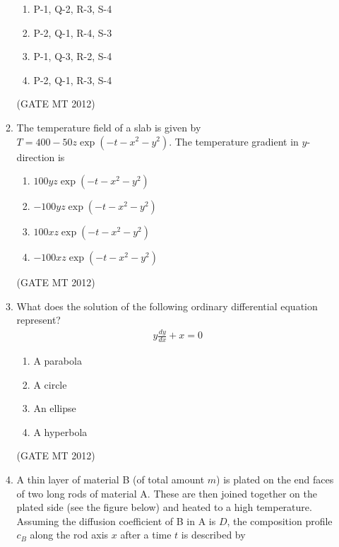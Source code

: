 \documentclass[journal, 11pt, onecolumn]{IEEEtran}
\theoremstyle{remark}
\begin{document}
\begin{enumerate}
\begin{enumerate}
\begin{multicols}{2}
\begin{enumerate}  
\item P-1, Q-2, R-3, S-4
\item P-2, Q-1, R-4, S-3
\item P-1, Q-3, R-2, S-4
\item P-2, Q-1, R-3, S-4
\end{enumerate}
\end{multicols}
\hfill(GATE MT 2012)

\item The temperature field of a slab is given by $T = 400 - 50z \exp(-t - x^2 - y^2)$. The temperature gradient in $y$-direction is

\begin{multicols}{2}
\begin{enumerate}  
\item $100yz \exp(-t - x^2 - y^2)$
\item $-100yz \exp(-t - x^2 - y^2)$
\item $100xz \exp(-t - x^2 - y^2)$
\item $-100xz \exp(-t - x^2 - y^2)$
\end{enumerate}
\end{multicols}
\hfill(GATE MT 2012)

\item What does the solution of the following ordinary differential equation represent? 
\begin{align}
    y \frac{dy}{dx} + x = 0
\end{align}

\begin{multicols}{2}
\begin{enumerate}  
\item A parabola
\item A circle
\item An ellipse
\item A hyperbola
\end{enumerate}
\end{multicols}
\hfill(GATE MT 2012)

\item A thin layer of material B (of total amount $m$) is plated on the end faces of two long rods of material A. These are then joined together on the plated side (see the figure below) and heated to a high temperature. Assuming the diffusion coefficient of B in A is $D$, the composition profile $c_B$ along the rod axis $x$ after a time $t$ is described by


\end{enumerate}
\end{enumerate}
\end{document}
